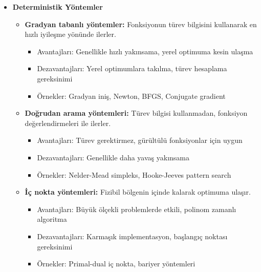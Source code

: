 \begin{itemize}
    \item \textbf{Deterministik Yöntemler}
        \begin{itemize}
            \item \textbf{Gradyan tabanlı yöntemler:} Fonksiyonun türev bilgisini kullanarak en hızlı iyileşme yönünde ilerler.
                \begin{itemize}
                    \item Avantajları: Genellikle hızlı yakınsama, yerel optimuma kesin ulaşma
                    \item Dezavantajları: Yerel optimumlara takılma, türev hesaplama gereksinimi
                    \item Örnekler: Gradyan iniş, Newton, BFGS, Conjugate gradient
                \end{itemize}
                
            \item \textbf{Doğrudan arama yöntemleri:} Türev bilgisi kullanmadan, fonksiyon değerlendirmeleri ile ilerler.
                \begin{itemize}
                    \item Avantajları: Türev gerektirmez, gürültülü fonksiyonlar için uygun
                    \item Dezavantajları: Genellikle daha yavaş yakınsama
                    \item Örnekler: Nelder-Mead simpleks, Hooke-Jeeves pattern search
                \end{itemize}
                
            \item \textbf{İç nokta yöntemleri:} Fizibil bölgenin içinde kalarak optimuma ulaşır.
                \begin{itemize}
                    \item Avantajları: Büyük ölçekli problemlerde etkili, polinom zamanlı algoritma
                    \item Dezavantajları: Karmaşık implementasyon, başlangıç noktası gereksinimi
                    \item Örnekler: Primal-dual iç nokta, bariyer yöntemleri
                \end{itemize}
        \end{itemize}
    

\end{itemize}
